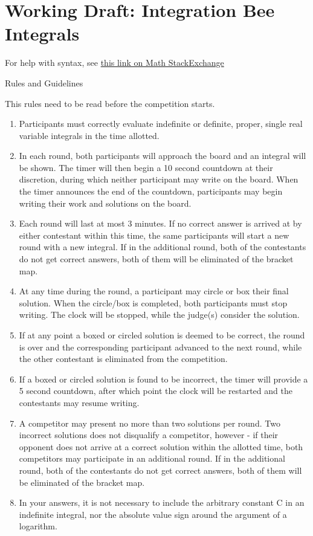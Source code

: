 \hypertarget{working-draft-integration-bee-integrals}{%
\section{Working Draft: Integration Bee
Integrals}\label{working-draft-integration-bee-integrals}}

For help with syntax, see
\href{https://math.meta.stackexchange.com/questions/5020/mathjax-basic-tutorial-and-quick-reference}{this
link on Math StackExchange}

Rules and Guidelines

This rules need to be read before the competition starts.

\begin{enumerate}
\def\labelenumi{\arabic{enumi}.}
\tightlist
\item
  Participants must correctly evaluate indefinite or definite, proper,
  single real variable integrals in the time allotted.
\item
  In each round, both participants will approach the board and an
  integral will be shown. The timer will then begin a 10 second
  countdown at their discretion, during which neither participant may
  write on the board. When the timer announces the end of the countdown,
  participants may begin writing their work and solutions on the board.
\item
  Each round will last at most 3 minutes. If no correct answer is
  arrived at by either contestant within this time, the same
  participants will start a new round with a new integral. If in the
  additional round, both of the contestants do not get correct answers,
  both of them will be eliminated of the bracket map.
\item
  At any time during the round, a participant may circle or box their
  final solution. When the circle/box is completed, both participants
  must stop writing. The clock will be stopped, while the judge(s)
  consider the solution.
\item
  If at any point a boxed or circled solution is deemed to be correct,
  the round is over and the corresponding participant advanced to the
  next round, while the other contestant is eliminated from the
  competition.
\item
  If a boxed or circled solution is found to be incorrect, the timer
  will provide a 5 second countdown, after which point the clock will be
  restarted and the contestants may resume writing.
\item
  A competitor may present no more than two solutions per round. Two
  incorrect solutions does not disqualify a competitor, however - if
  their opponent does not arrive at a correct solution within the
  allotted time, both competitors may participate in an additional
  round. If in the additional round, both of the contestants do not get
  correct answers, both of them will be eliminated of the bracket map.
\item
  In your answers, it is not necessary to include the arbitrary constant
  C in an indefinite integral, nor the absolute value sign around the
  argument of a logarithm.
\end{enumerate}

